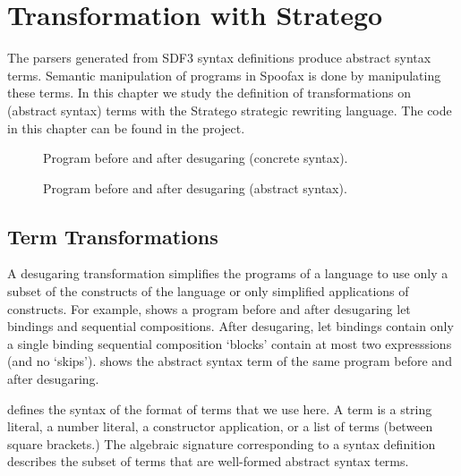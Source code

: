 \chapter{Transformation with Stratego}

The parsers generated from SDF3 syntax definitions produce abstract syntax
terms. Semantic manipulation of programs in Spoofax is done by manipulating
these terms. In this chapter we study the definition of transformations on
(abstract syntax) terms with the Stratego strategic rewriting language. The code
in this chapter can be found in the  project.

\begin{figure}[p]
\begin{minipage}[t]{0.47\hsize}

\end{minipage}
\hfill
\begin{minipage}[t]{0.47\hsize}

\end{minipage}
\caption{Program before and after desugaring (concrete syntax).}
\bigskip
{}


\caption{Program before and after desugaring (abstract syntax).}
\end{figure}

\section{Term Transformations}

A desugaring transformation simplifies the programs of a language to use only a
subset of the constructs of the language or only simplified applications of
constructs. 
For example,  shows a program before and after
desugaring let bindings and sequential compositions. After desugaring, let
bindings contain only a single binding sequential composition `blocks' contain
at most two expresssions (and no `skips').
 shows the abstract syntax term of the same
program before and after desugaring.

 defines the syntax of the format of terms that we use here.
A term is a string literal, a number literal, a constructor application, or a
list of terms (between square brackets.)
The algebraic signature corresponding to a syntax definition describes the
subset of terms that are well-formed abstract syntax terms.

